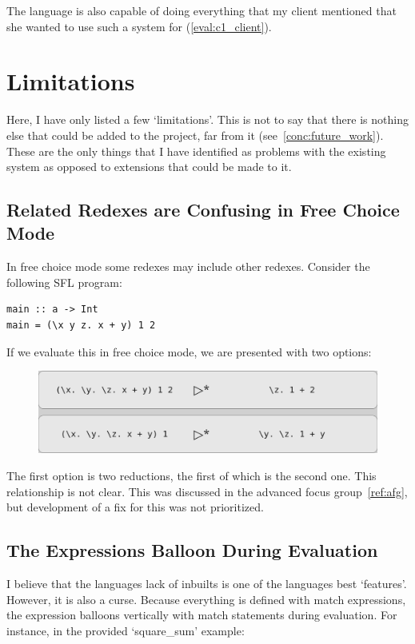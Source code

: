 \noindent The language is also capable of doing everything that my client mentioned that she wanted to use such a system for (\ref{eval:c1_client}).


\section{Limitations}
Here, I have only listed a few `limitations'. This is not to say that there is nothing else that could be added to the project, far from it (see~\ref{conc:future_work}). These are the only things that I have identified as problems with the existing system as opposed to extensions that could be made to it. 

\subsection{Related Redexes are Confusing in Free Choice Mode}
In free choice mode some redexes may include other redexes. Consider the following \ac{SFL} program:

\begin{lstlisting}[language=SFL]
main :: a -> Int 
main = (\x y z. x + y) 1 2
\end{lstlisting}

\noindent If we evaluate this in free choice mode, we are presented with two options:

\begin{figure}[!h]
    \centering
    \includegraphics[width=0.75\linewidth]{images/conc_add_3.png}
\end{figure}

\noindent The first option is two reductions, the first of which is the second one. This relationship is not clear. This was discussed in the advanced focus group~\ref{ref:afg}, but development of a fix for this was not prioritized. 

\subsection{The Expressions Balloon During Evaluation}
\label{conc:baboon}
I believe that the languages lack of inbuilts is one of the languages best `features'. However, it is also a curse. Because everything is defined with match expressions, the expression balloons vertically with match statements during evaluation. For instance, in the provided `square\_sum' example:

